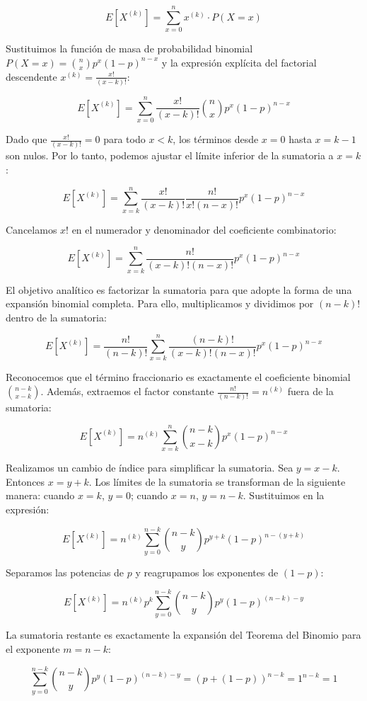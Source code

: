 $$ E[X^{(k)}] = \sum_{x=0}^{n} x^{(k)} \cdot P(X = x) $$

Sustituimos la función de masa de probabilidad binomial $P(X=x) = \binom{n}{x} p^x (1-p)^{n-x}$ y la expresión explícita del factorial descendente $x^{(k)} = \frac{x!}{(x-k)!}$:

$$ E[X^{(k)}] = \sum_{x=0}^{n} \frac{x!}{(x-k)!} \binom{n}{x} p^x (1-p)^{n-x} $$

Dado que $\frac{x!}{(x-k)!} = 0$ para todo $x < k$, los términos desde $x=0$ hasta $x=k-1$ son nulos. Por lo tanto, podemos ajustar el límite inferior de la sumatoria a $x=k$:

$$ E[X^{(k)}] = \sum_{x=k}^{n} \frac{x!}{(x-k)!} \frac{n!}{x!(n-x)!} p^x (1-p)^{n-x} $$

Cancelamos $x!$ en el numerador y denominador del coeficiente combinatorio:

$$ E[X^{(k)}] = \sum_{x=k}^{n} \frac{n!}{(x-k)!(n-x)!} p^x (1-p)^{n-x} $$

El objetivo analítico es factorizar la sumatoria para que adopte la forma de una expansión binomial completa. Para ello, multiplicamos y dividimos por $(n-k)!$ dentro de la sumatoria:

$$ E[X^{(k)}] = \frac{n!}{(n-k)!} \sum_{x=k}^{n} \frac{(n-k)!}{(x-k)!(n-x)!} p^x (1-p)^{n-x} $$

Reconocemos que el término fraccionario es exactamente el coeficiente binomial $\binom{n-k}{x-k}$. Además, extraemos el factor constante $\frac{n!}{(n-k)!} = n^{(k)}$ fuera de la sumatoria:

$$ E[X^{(k)}] = n^{(k)} \sum_{x=k}^{n} \binom{n-k}{x-k} p^x (1-p)^{n-x} $$

Realizamos un cambio de índice para simplificar la sumatoria. Sea $y = x - k$. Entonces $x = y + k$. Los límites de la sumatoria se transforman de la siguiente manera: cuando $x = k$, $y = 0$; cuando $x = n$, $y = n - k$. Sustituimos en la expresión:

$$ E[X^{(k)}] = n^{(k)} \sum_{y=0}^{n-k} \binom{n-k}{y} p^{y+k} (1-p)^{n-(y+k)} $$

Separamos las potencias de $p$ y reagrupamos los exponentes de $(1-p)$:

$$ E[X^{(k)}] = n^{(k)} p^k \sum_{y=0}^{n-k} \binom{n-k}{y} p^y (1-p)^{(n-k)-y} $$

La sumatoria restante es exactamente la expansión del Teorema del Binomio para el exponente $m = n-k$:

$$ \sum_{y=0}^{n-k} \binom{n-k}{y} p^y (1-p)^{(n-k)-y} = (p + (1-p))^{n-k} = 1^{n-k} = 1 $$

